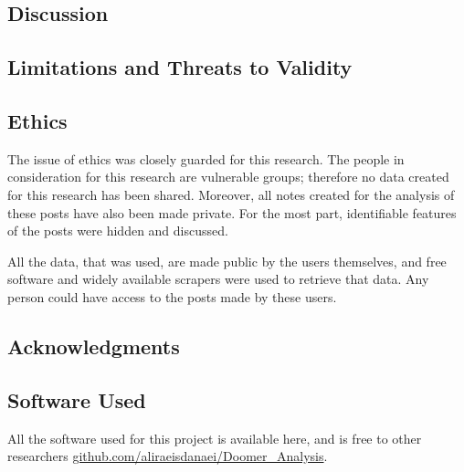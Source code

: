 \documentclass[../report.tex]{subfiles}
\begin{document}
\subsection{Discussion}

\subsection{Limitations and Threats to Validity}

\subsection{Ethics}
The issue of ethics was closely guarded for this research.
The people in consideration for this research are vulnerable groups; therefore no data created for this research has been shared. 
Moreover, all notes created for the analysis of these posts have also been made private. 
For the most part, identifiable features of the posts were hidden and discussed.

All the data, that was used, are made public by the users themselves, and free software and widely available scrapers were used to retrieve that data. 
Any person could have access to the posts made by these users. 

\subsection{Acknowledgments}

\subsection{Software Used}
All the software used for this project is available here, and is free to other researchers \href{https://github.com/aliraeisdanaei/Doomer_Analysis}{github.com/aliraeisdanaei/Doomer_Analysis}.
\end{document}
